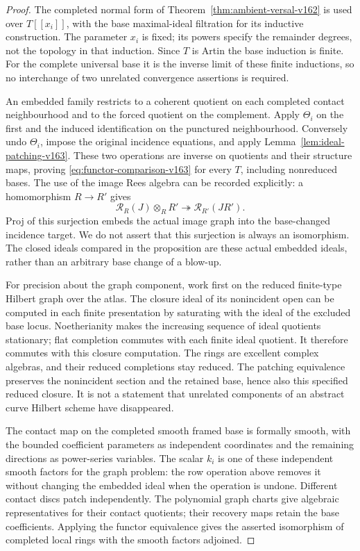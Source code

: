\documentclass[11pt,reqno]{amsart}
\numberwithin{equation}{section}
\theoremstyle{definition}\newtheorem{definition}[theorem]{Definition}
\theoremstyle{remark}\newtheorem{remark}[theorem]{Remark}
\begin{document}
\begin{proof}
The completed normal form of
Theorem~\ref{thm:ambient-versal-v162} is used over
$T[[x_i]]$, with the base maximal-ideal filtration for its inductive
construction. The parameter $x_i$ is fixed; its powers specify the
remainder degrees, not the topology in that induction. Since $T$
is Artin the base induction is finite. For the complete universal
base it is the inverse limit of these finite inductions, so no
interchange of two unrelated convergence assertions is required.

An embedded family restricts to a coherent quotient on each
completed contact neighbourhood and to the forced quotient on the
complement. Apply $\Theta_i$ on the first and the induced
identification on the punctured neighbourhood. Conversely undo
$\Theta_i$, impose the original incidence equations, and apply
Lemma~\ref{lem:ideal-patching-v163}. These two operations are inverse
on quotients and their structure maps, proving \eqref{eq:functor-comparison-v163}
for every $T$, including nonreduced bases. The use of the image Rees
algebra can be recorded explicitly: a homomorphism $R\to R'$ gives
\[
        \mathcal R_R(J)\otimes_RR'\twoheadrightarrow
                          \mathcal R_{R'}(JR').
\]
Proj of this surjection embeds the actual image graph into the
base-changed incidence target. We do not assert that this
surjection is always an isomorphism. The closed ideals compared
in the proposition are these actual embedded ideals, rather than
an arbitrary base change of a blow-up.

For precision about the graph component, work first on the reduced
finite-type Hilbert graph over the atlas. The closure ideal of its
nonincident open can be computed in each finite presentation by
saturating with the ideal of the excluded base locus. Noetherianity
makes the increasing sequence of ideal quotients stationary; flat
completion commutes with each finite ideal quotient. It therefore
commutes with this closure computation. The rings are excellent
complex algebras, and their reduced completions stay reduced.
The patching equivalence preserves the nonincident section and the
retained base, hence also this specified reduced closure. It is
not a statement that unrelated components of an abstract curve
Hilbert scheme have disappeared.

The contact map on the completed smooth framed base is formally
smooth, with the bounded coefficient parameters as independent
coordinates and the remaining directions as power-series variables.
The scalar $k_i$ is one of these independent smooth factors for
the graph problem: the row operation above removes it without
changing the embedded ideal when the operation is undone.
Different contact discs patch independently. The polynomial graph
charts give algebraic representatives for their contact quotients;
their recovery maps retain the base coefficients. Applying the
functor equivalence gives the asserted isomorphism of completed
local rings with the smooth factors adjoined.


\end{proof}
\end{document}
